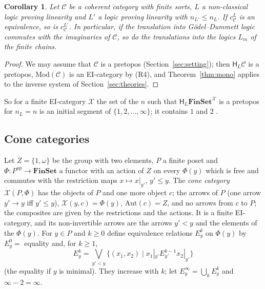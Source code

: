 \documentclass[11pt]{amsart}
\newtheorem{cor}[thm]{Corollary}
\theoremstyle{definition}
\newcommand{\Fin}{\mathbf{FinSet}}
\newcommand{\Mod}{\mathrm{Mod}}
\newcommand{\Aut}{\mathrm{Aut}}
\newcommand{\HH}{\mathsf H}
\newcommand{\cX}{\mathcal X}
\newcommand{\cC}{\mathcal C}
\begin{document}
\begin{cor}\label{cor:mono}
Let $\cC$ be a coherent category with finite sorts, $L$ a
non-classical logic proving linearity and $L'$ a logic proving
linearity with $n_{L'}\le n_L$. If $c^L_\cC$ is an equivalence, so is
$c^{L'}_\cC$. In particular, if the translation into G\"odel--Dummett
logic commutes with the imaginaries of $\cC$, so do the translations
into the logics $L_m$ of the finite chains.
\end{cor}
\begin{proof}
We may assume that $\cC$ is a pretopos (Section~\ref{sec:setting});
then $\HH_L\cC$ is a pretopos, $\Mod(\cC)$ is an EI-category by (R4),
and Theorem~\ref{thm:mono} applies to the inverse system of
Section~\ref{sec:theories}.
\end{proof}

So for a finite EI-category $\cX$ the set of the $n$ such that
$\HH_L\Fin^\cX$ is a pretopos for $n_L=n$ is an initial segment of
$\{1,2,\dots,\infty\}$; it contains $1$ and $2$
\cite[Cor.~6.3]{Strings}.

\subsection*{Cone categories}
Let $Z=\{1,\omega\}$ be the group with two elements, $P$ a finite
poset and $\Phi\colon P^{op}\to\Fin$ a functor with an action of $Z$
on every $\Phi(y)$ which is free and commutes with the restriction
maps $x\mapsto x|_{y'}$, $y'\le y$. The \emph{cone category}
$\cX(P,\Phi)$ has the objects of $P$ and one more object $c$; the
arrows of $P$ (one arrow $y'\to y$ iff $y'\le y$), $\cX(y,c)=\Phi(y)$,
$\Aut(c)=Z$, and no arrows from $c$ to $P$; the composites are given
by the restrictions and the actions. It is a finite EI-category, and
its non-invertible arrows are the arrows $y'<y$ and the elements of
the $\Phi(y)$. For $y\in P$ and $k\ge0$ define equivalence relations
$E^k_y$ on $\Phi(y)$ by $E^0_y=$ equality and, for $k\ge1$,
\[
E^k_y=\bigvee_{y'<y}\{(x_1,x_2)\mid x_1|_{y'}\mathrel{E^{k-1}_{y'}}
x_2|_{y'}\}
\]
(the equality if $y$ is minimal). They increase with $k$; let
$E^\infty_y=\bigcup_kE^k_y$ and $\infty-2=\infty$.
\end{document}
